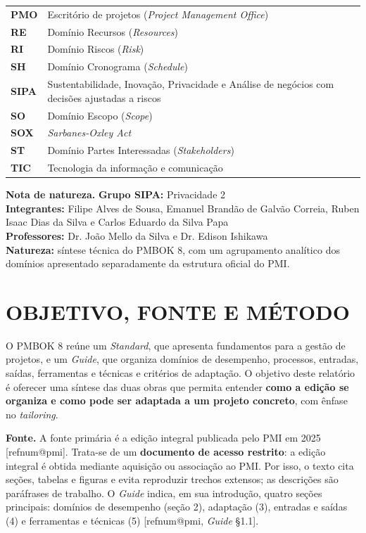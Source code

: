 \documentclass[12pt,a4paper,article,oneside,english,brazil]{abntex2}
\makeatletter
\newcommand{\refnum}[1]{\csname refnum@#1\endcsname}
\makeatother
\begin{document}
\begin{longtable}{@{}>{\raggedright\arraybackslash}p{2.6cm}>{\raggedright\arraybackslash}p{\dimexpr\linewidth-2.6cm-2\tabcolsep\relax}@{}}
\textbf{PMO} & Escritório de projetos (\textit{Project Management Office})\\[2pt]
\textbf{RE} & Domínio Recursos (\textit{Resources})\\[2pt]
\textbf{RI} & Domínio Riscos (\textit{Risk})\\[2pt]
\textbf{SH} & Domínio Cronograma (\textit{Schedule})\\[2pt]
\textbf{SIPA} & Sustentabilidade, Inovação, Privacidade e Análise de negócios com decisões ajustadas a riscos\\[2pt]
\textbf{SO} & Domínio Escopo (\textit{Scope})\\[2pt]
\textbf{SOX} & \textit{Sarbanes-Oxley Act}\\[2pt]
\textbf{ST} & Domínio Partes Interessadas (\textit{Stakeholders})\\[2pt]
\textbf{TIC} & Tecnologia da informação e comunicação\\[2pt]
\end{longtable}
\endgroup
\clearpage

\setcounter{table}{0}
\begin{flushleft}\small\SingleSpacing
\noindent\textbf{Nota de natureza.} \textbf{Grupo SIPA:} Privacidade 2\\ \textbf{Integrantes:} Filipe Alves de Sousa, Emanuel Brandão de Galvão Correia, Ruben Isaac Dias da Silva e Carlos Eduardo da Silva Papa\\ \textbf{Professores:} Dr. João Mello da Silva e Dr. Edison Ishikawa\\ \textbf{Natureza:} síntese técnica do PMBOK 8, com um agrupamento analítico dos domínios apresentado separadamente da estrutura oficial do PMI.
\end{flushleft}
\vspace{\onelineskip}

\section{OBJETIVO, FONTE E MÉTODO}

O PMBOK 8 reúne um \textit{Standard}, que apresenta fundamentos para a gestão de projetos, e um \textit{Guide}, que organiza domínios de desempenho, processos, entradas, saídas, ferramentas e técnicas e critérios de adaptação. O objetivo deste relatório é oferecer uma síntese das duas obras que permita entender \textbf{como a edição se organiza e como pode ser adaptada a um projeto concreto}, com ênfase no \textit{tailoring}.

\textbf{Fonte.} A fonte primária é a edição integral publicada pelo PMI em 2025 [\refnum{pmi}]. Trata-se de um \textbf{documento de acesso restrito}: a edição integral é obtida mediante aquisição ou associação ao PMI. Por isso, o texto cita seções, tabelas e figuras e evita reproduzir trechos extensos; as descrições são paráfrases de trabalho. O \textit{Guide} indica, em sua introdução, quatro seções principais: domínios de desempenho (seção 2), adaptação (3), entradas e saídas (4) e ferramentas e técnicas (5) [\refnum{pmi}, \textit{Guide} §1.1].
\end{document}
